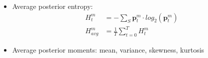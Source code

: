 \documentclass{beamer}
\newcommand{\vm}[1]{\ensuremath{\bm{#1}}}  %
\begin{document}
\begin{frame}
{\begin{minipage}[t]{0.45\textwidth}
    \begin{itemize}
      \item Average posterior entropy:
      {\footnotesize
      \begin{align*}
        H^m_t &= - \sum_{S} \vm{p}^m_t  \cdot log_2 \left( \vm{p}^m_t \right) \\
        H^m_{avg} &= \frac{1}{T} \sum_{t=0}^{T} H^m_t 
      \end{align*}
      }
      \item Average posterior moments: mean, variance, skewness, kurtosis
    \end{itemize}  

  \end{minipage}
  }
  
\end{frame}



\end{document}
